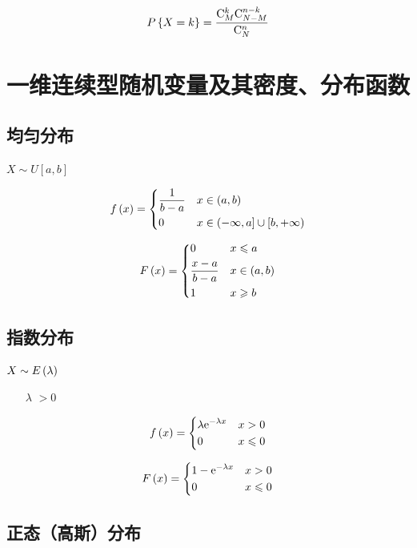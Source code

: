 \documentclass{article}
\begin{document}
\[P\left\{X=k\right\}=\frac{\mathrm C_M^k\mathrm C_{N-M}^{n-k}}{\mathrm C_N^n}\]

\section{一维连续型随机变量及其密度、分布函数}

\subsection{均匀分布}

$X\sim U\left[a,b\right]$

\[f\left(x\right)=\left\{\begin{aligned}
         & \frac1{b-a} &  & x\in\left(a,b\right)                                          \\
         & 0           &  & x\in\left(-\infty,a\right]\cup\left[b,+\infty\right)
    \end{aligned}\right.\]

\[F\left(x\right)=\left\{\begin{aligned}
         & 0               &  & x\leqslant a \\
         & \frac{x-a}{b-a} &  & x\in\left(a,b\right)  \\
         & 1               &  & x\geqslant b
    \end{aligned}\right.\]

\subsection{指数分布}

$X\sim E\left(\lambda\right)$

\begin{enumerate}
    \item [$\lambda$] $>0$
\end{enumerate}

\[f\left(x\right)=\left\{\begin{aligned}
         & \lambda\mathrm e^{-\lambda x} &  & x>0         \\
         & 0                      &  & x\leqslant0
    \end{aligned}\right.\]

\[F\left(x\right)=\left\{\begin{aligned}
         & 1-\mathrm e^{-\lambda x} &  & x>0         \\
         & 0                 &  & x\leqslant0
    \end{aligned}\right.\]

\subsection{正态（高斯）分布}
\end{document}
